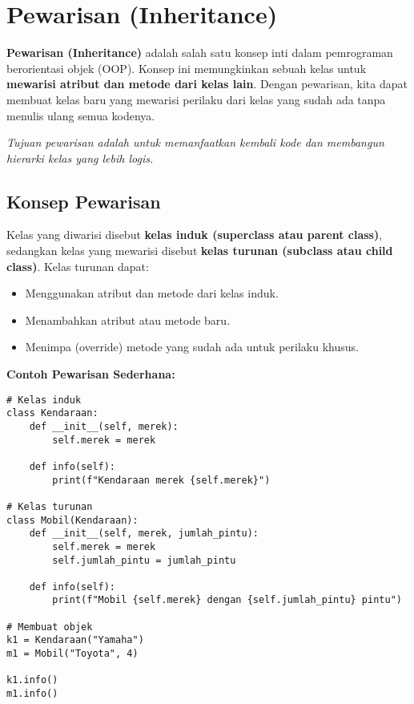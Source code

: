 \section{Pewarisan (Inheritance)}

\textbf{Pewarisan (Inheritance)} adalah salah satu konsep inti dalam pemrograman berorientasi objek (OOP).  
Konsep ini memungkinkan sebuah kelas untuk \textbf{mewarisi atribut dan metode dari kelas lain}.  
Dengan pewarisan, kita dapat membuat kelas baru yang mewarisi perilaku dari kelas yang sudah ada tanpa menulis ulang semua kodenya.

\begin{center}
\textit{Tujuan pewarisan adalah untuk memanfaatkan kembali kode dan membangun hierarki kelas yang lebih logis.}
\end{center}

\subsection{Konsep Pewarisan}

Kelas yang diwarisi disebut \textbf{kelas induk (superclass atau parent class)},  
sedangkan kelas yang mewarisi disebut \textbf{kelas turunan (subclass atau child class)}.  
Kelas turunan dapat:
\begin{itemize}
    \item Menggunakan atribut dan metode dari kelas induk.
    \item Menambahkan atribut atau metode baru.
    \item Menimpa (override) metode yang sudah ada untuk perilaku khusus.
\end{itemize}

\noindent\textbf{Contoh Pewarisan Sederhana:}

\begin{lstlisting}[style=PythonStyle, caption={Contoh Pewarisan Dasar}]
# Kelas induk
class Kendaraan:
    def __init__(self, merek):
        self.merek = merek

    def info(self):
        print(f"Kendaraan merek {self.merek}")

# Kelas turunan
class Mobil(Kendaraan):
    def __init__(self, merek, jumlah_pintu):
        self.merek = merek
        self.jumlah_pintu = jumlah_pintu

    def info(self):
        print(f"Mobil {self.merek} dengan {self.jumlah_pintu} pintu")

# Membuat objek
k1 = Kendaraan("Yamaha")
m1 = Mobil("Toyota", 4)

k1.info()
m1.info()
\end{lstlisting}

